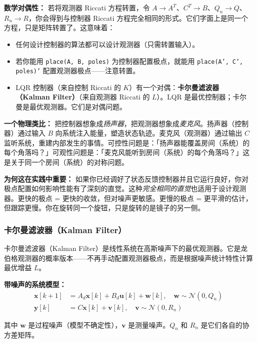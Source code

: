 \textbf{数学对偶性：} 若将观测器 Riccati 方程转置，令 $A \to A^T$、$C^T \to B$、$Q_n \to Q$、$R_n \to R$，你会得到与控制器 Riccati 方程完全相同的形式。它们字面上是同一个方程，只是矩阵转置了。这意味着：

\begin{itemize}
    \item 任何设计控制器的算法都可以设计观测器（只需转置输入）。
    \item 若你能用 \texttt{place(A, B, poles)} 为控制器配置极点，就能用 \texttt{place(A', C', poles)'} 配置观测器极点——注意转置。
    \item LQR 控制器（来自控制 Riccati 的 $K$）有一个对偶：\textbf{卡尔曼滤波器（Kalman Filter）}（来自观测器 Riccati 的 $L$）。LQR 是最优控制器；卡尔曼是最优观测器。它们是对偶问题。
\end{itemize}

\textbf{一个物理类比：} 把控制器想象成\textit{扬声器}，把观测器想象成\textit{麦克风}。扬声器（控制器）通过输入 $B$ 向系统注入能量，塑造状态轨迹。麦克风（观测器）通过输出 $C$ 监听系统，重建内部发生的事情。可控性问题是：「扬声器能覆盖房间（系统）的每个角落吗？」可观性问题是：「麦克风能听到房间（系统）的每个角落吗？」这是关于同一个房间（系统）的对称问题。

\textbf{为何这在实践中重要：} 如果你已经调好了状态反馈控制器并且它运行良好，你对极点配置如何影响性能有了深刻的直觉。这种\textit{完全相同的直觉}也适用于设计观测器。更快的极点 = 更快的收敛，但对噪声更敏感。更慢的极点 = 更平滑的估计，但跟踪更慢。你在旋转同一个旋钮，只是旋转的是镜子的另一侧。

\subsubsection{卡尔曼滤波器（Kalman Filter）}

卡尔曼滤波器（Kalman Filter）是线性系统在高斯噪声下的最优观测器。它是龙伯格观测器的概率版本——不再手动配置观测器极点，而是根据噪声统计特性计算最优增益 $L$。

\textbf{带噪声的系统模型：}
\begin{align}
\mathbf{x}[k+1] &= A_d \mathbf{x}[k] + B_d \mathbf{u}[k] + \mathbf{w}[k], \quad \mathbf{w} \sim \mathcal{N}(0, Q_n) \\
\mathbf{y}[k] &= C \mathbf{x}[k] + \mathbf{v}[k], \quad \mathbf{v} \sim \mathcal{N}(0, R_n)
\end{align}

其中 $\mathbf{w}$ 是过程噪声（模型不确定性），$\mathbf{v}$ 是测量噪声。$Q_n$ 和 $R_n$ 是它们各自的协方差矩阵。

